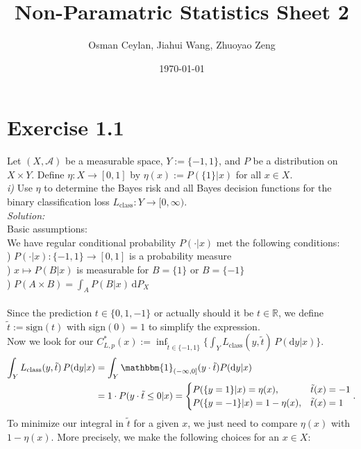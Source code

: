 \documentclass{article}
\title{Non-Paramatric Statistics Sheet 2}
\author{Osman Ceylan, Jiahui Wang, Zhuoyao Zeng}
\date{\today}
\begin{document}
\maketitle
\section*{Exercise 1.1}
Let $(X, \mathcal{A})$ be a measurable space, $Y := \{-1,1\}$, and $P$ be a distribution on $X \times Y$. Define $\eta: X \rightarrow [0,1]$ by $\eta(x) := P(\{1\}|x)$ for all $x \in X$.\vspace{0.7em}\\
\textsl{i)} Use $\eta$ to determine the Bayes risk and all Bayes decision functions for the binary classification loss $L_\text{class}:Y \rightarrow [0,\infty )$.\vspace{0.5em}\\
\textsl{Solution:} \\
Basic assumptions:\\
We have regular conditional probability $P(\cdot|x)$ met the following conditions:\\ 
) $P(\cdot|x):\{-1,1\} \rightarrow [0,1]$ is a probability measure \\
) $x \mapsto P(B|x)$ is measurable for $B = \{1\}$ or $B = \{-1\}$ \\
) $P(A \times B) = \displaystyle{ \int_{A} P(B|x)\, \text{d}P_X  }$\\
 \\
Since the prediction $t \in \{0,1,-1\}$ or actually should it be $t \in \mathbb{R}$, we define $\tilde{t}:= \text{sign}(t)$ with sign$(0) = 1$ to simplify the expression. \\
Now we look for our $C^*_{L,p}(x):= \inf_{\tilde{t}\in \{-1,1\}}\{\displaystyle{ \int_{Y} L_\text{class}(y,\tilde{t})\, P(\text{d}y|x)} \}$.  
\begin{align*}
\displaystyle{ \int_{Y} L_\text{class}(y,\tilde{t})\, P(\text{d}y|x) }
 & = \displaystyle{ \int_{Y} \mathbbm{1}_{(-\infty,0]}(y\cdot\tilde{t}) P(\text{d}y|x)} \\
 & = 1 \cdot P(y\cdot\tilde{t} \leq 0 | x) =  \begin{cases} P(\{y=1\}|x) = \eta(x), &\tilde{t}(x) = -1 \cr  P(\{y=-1\}|x) = 1- \eta(x), &\tilde{t}(x) = 1 \end{cases}.
\end{align*}
To minimize our integral in $\tilde{t}$ for a given $x$, we just need to compare $\eta(x)$ with $1 - \eta(x)$. More precisely, we make the following choices for an $x\in X$:\\
\end{document}

